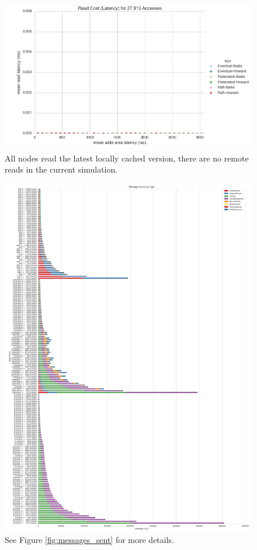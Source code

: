 \documentclass[11pt,letterpaper]{article}
\begin{document}
\begin{figure}[!h]
    \centering
        \includegraphics[width=\textwidth]{figures/read_latency.png}
        \caption{\textsf{All nodes read the latest locally cached version, there are no remote reads in the current simulation.}}
        \label{fig:read_latency}
\end{figure}

\begin{figure}[!h]
    \centering
        \includegraphics[height=.9\textheight]{figures/message_counts.png}
        \caption{\textsf{See Figure \ref{fig:messages_sent} for more details.}}
        \label{fig:message_counts}
\end{figure}
\end{document}
